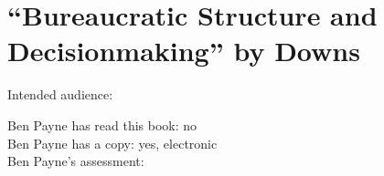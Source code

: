 \section{``Bureaucratic Structure and Decisionmaking'' by Downs}

\cite{1966_Downs}

Intended audience:

Ben Payne has read this book: no\\
Ben Payne has a copy: yes, electronic\\
Ben Payne's assessment:

